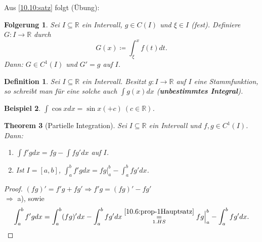 \documentclass{extreport}
\newcommand{\R}{\mathbb{R}}
\theoremstyle{named}
\newtheorem{namedtheorem}{Theorem} \counterwithin{namedtheorem}{chapter}
\theoremstyle{dotless}
\newtheorem{beispiel}[namedtheorem]{Beispiel}
\newtheorem{folgerung}[namedtheorem]{Folgerung}
\newtheorem*{definition}{Definition}
\begin{document}
Aus \ref{10.10:satz} folgt (Übung):

\begin{folgerung} \label{10.12:folg}
	Sei $I \subseteq \R$ ein Intervall, $g \in C(I)$ und $\xi \in I$ (fest). Definiere $G \colon I \rightarrow \R$ durch
	$$ G(x) \coloneqq \int_{\xi}^{x} f(t) dt. $$
	Dann: $G \in C^{1}(I)$ und $G' = g$ auf $I$.
\end{folgerung}

\begin{definition}
	Sei $I \subseteq \R$ ein Intervall. Besitzt $g \colon I \rightarrow \R$ auf $I$ eine Stammfunktion, so schreibt man für eine solche auch $\int g(x) dx$ (\textbf{unbestimmtes Integral}).
\end{definition}

\begin{beispiel} 
	$\int \cos x dx = \sin x ( + c) ~(c \in \R)$.
\end{beispiel}

\begin{namedtheorem}[Partielle Integration]
	Sei $I \subseteq \R$ ein Intervall und $f, g \in C^{1}(I)$. Dann:
	\begin{enumerate}
		\item $\int f' g dx = f g - \int f g' dx$ auf $I$.
		\item Ist $I = [a, b]$, $\int_{a}^{b} f' g dx = f g \Big|_{a}^{b} - \int_{a}^{b} f g' dx$.
	\end{enumerate}
\end{namedtheorem}

\begin{proof}
	$(f g)' = f' g + f g' \Rightarrow f' g = (fg)' - fg'$ \\
	$\Rightarrow$ a), sowie \\ 
	$$ \int_{a}^{b} f' g dx = \int_{a}^{b} (fg)' dx - \int_{a}^{b} fg' dx \overset{\ref{10.6:prop-1Hauptsatz}}{\underset{1. HS}{=}} fg \Big|_{a}^{b} - \int_{a}^{b} fg' dx. $$ 
\end{proof}
\end{document}
